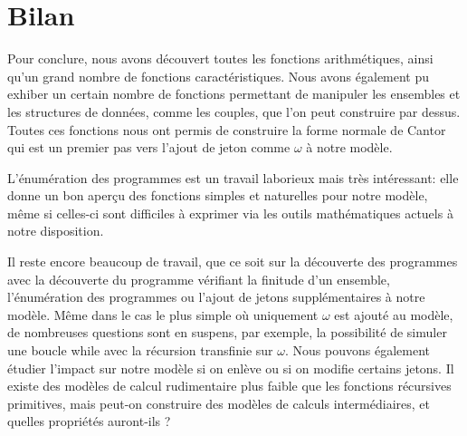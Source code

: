 \documentclass[a4paper, 11pt]{article}
\begin{document}
\newpage

\section{Bilan}

Pour conclure, nous avons découvert toutes les fonctions arithmétiques, ainsi qu'un grand nombre
de fonctions caractéristiques. Nous avons également pu exhiber un certain nombre de fonctions
permettant de manipuler les ensembles et les structures de données, comme les couples,
que l'on peut construire par dessus. Toutes ces fonctions nous ont permis de construire 
la forme normale de Cantor qui est un premier pas vers l'ajout de jeton comme $\omega$ à notre modèle.

L'énumération des programmes est un travail laborieux mais très intéressant: elle donne
un bon aperçu des fonctions simples et naturelles pour notre modèle, même si celles-ci sont
difficiles à exprimer via les outils mathématiques actuels à notre disposition.

Il reste encore beaucoup de travail, que ce soit sur la découverte des programmes avec
la découverte du programme vérifiant la finitude d'un ensemble, l'énumération
des programmes ou l'ajout de jetons supplémentaires à notre modèle.
Même dans le cas le plus simple où uniquement $\omega$ est ajouté
au modèle, de nombreuses questions sont en suspens, par exemple, la possibilité
de simuler une boucle while avec la récursion transfinie sur $\omega$.
Nous pouvons également étudier l'impact sur notre modèle si on enlève ou si on
modifie certains jetons. Il existe des modèles de calcul rudimentaire 
plus faible que les fonctions récursives primitives, mais peut-on construire des modèles
de calculs intermédiaires, et quelles propriétés auront-ils ?

\newpage




\newpage

\newpage
\end{document}
